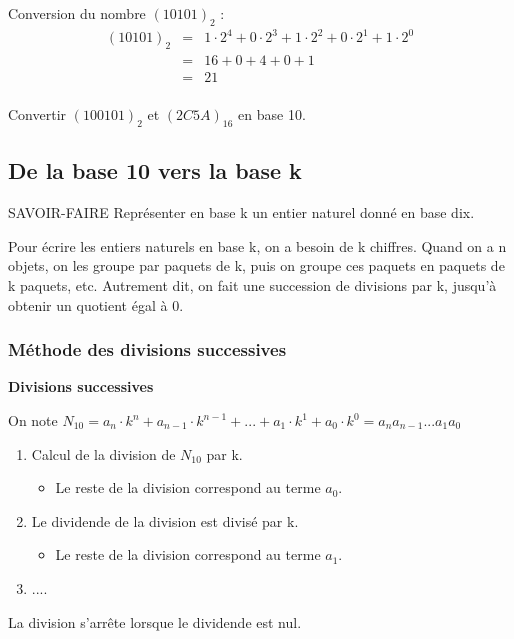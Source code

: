 \documentclass[10pt,fleqn]{article} %
\begin{document}
\begin{exemple}
Conversion du nombre $\left(10101\right)_2$ :
\begin{eqnarray*}
\left(10101\right)_2 &=& 1\cdot 2^{4}+0\cdot 2^{3}+1\cdot 2^{2}+0\cdot 2^{1}+1\cdot 2^{0} \\
 & = & 16 + 0 + 4 + 0  + 1\\
 & = & 21\\
\end{eqnarray*}
\end{exemple}

\begin{exemple}
Convertir $(100101)_2$ et $(2C5A)_{16}$ en base 10. 
\vspace{5cm}
\end{exemple}
\subsection{De la base 10 vers la base k}


\begin{resultat}
SAVOIR-FAIRE Représenter en base k un entier naturel donné en base dix.

Pour écrire les entiers naturels en base k, on a besoin de k chiffres. Quand on a n
objets, on les groupe par paquets de k, puis on groupe ces paquets en paquets de k
paquets, etc. Autrement dit, on fait une succession de divisions par k, jusqu’à obtenir
un quotient égal à 0.
\end{resultat}

\subsubsection{Méthode des divisions successives}
\begin{methode}
\textbf{Divisions successives}

On note $N_{10} = a_n\cdot k^n + a_{n-1}\cdot k^{n-1}+ ... +a_1\cdot k^1 + a_0\cdot k^0 = a_n a_{n-1}...a_1 a_0$

\begin{enumerate}
\item Calcul de la division de $N_{10}$ par k.
\begin{itemize}
\item Le reste de la division correspond au terme $a_0$.
\end{itemize}
\item Le dividende de la division est divisé par k.
\begin{itemize}
\item Le reste de la division correspond au terme $a_1$.
\end{itemize}
\item ....
\end{enumerate}

La division s'arrête lorsque le dividende est nul.
\end{methode}
\end{document}
